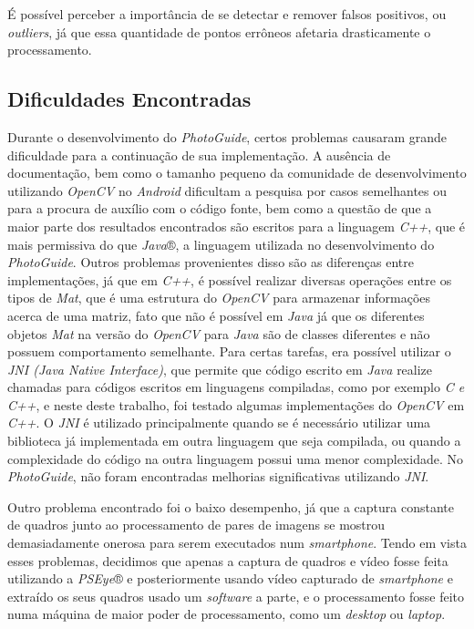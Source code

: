 É possível perceber a importância de se detectar e remover falsos positivos, ou \textit{outliers}, já que essa quantidade de pontos errôneos afetaria drasticamente o processamento.

\subsection{Dificuldades Encontradas}

Durante o desenvolvimento do \textit{PhotoGuide}, certos problemas causaram grande dificuldade para a continuação de sua implementação. A ausência de documentação, bem como o tamanho pequeno da comunidade de desenvolvimento utilizando \textit{OpenCV} no \textit{Android} dificultam a pesquisa por casos semelhantes ou para a procura de auxílio com o código fonte, bem como a questão de que a maior parte dos resultados encontrados são escritos para a linguagem \textit{C++}, que é mais permissiva do que \textit{Java}®, a linguagem utilizada no desenvolvimento do \textit{PhotoGuide}. Outros problemas provenientes disso são as diferenças entre implementações, já que em \textit{C++}, é possível realizar diversas operações entre os tipos de \textit{Mat},  que é uma estrutura do \textit{OpenCV} para armazenar informações acerca de uma matriz, fato que não é possível em \textit{Java} já que os diferentes objetos \textit{Mat} na versão do \textit{OpenCV} para \textit{Java} são de classes diferentes e não possuem comportamento semelhante. Para certas tarefas, era possível utilizar o \textit{JNI (Java Native Interface)}\cite{JNI}, que permite que código escrito em \textit{Java }realize chamadas para códigos escritos em linguagens compiladas, como por exemplo \textit{C e C++}, e neste deste trabalho, foi testado algumas implementações do \textit{OpenCV} em \textit{C++}. O \textit{JNI} é utilizado principalmente quando se é necessário utilizar uma biblioteca já implementada em outra linguagem que seja compilada, ou quando a complexidade do código na outra linguagem possui uma menor complexidade. No \textit{PhotoGuide}, não foram encontradas melhorias significativas utilizando \textit{JNI}. 

Outro problema encontrado foi o baixo desempenho, já que a captura constante de quadros junto ao processamento de pares de imagens se mostrou demasiadamente onerosa para serem executados num \textit{smartphone}. Tendo em vista esses problemas, decidimos que apenas a captura de quadros e vídeo fosse feita utilizando a \textit{PSEye}® e posteriormente usando vídeo capturado de \textit{smartphone} e extraído os seus quadros usado um \textit{software} a parte, e o processamento fosse feito numa máquina de maior poder de processamento, como um \textit{desktop} ou \textit{laptop}.

